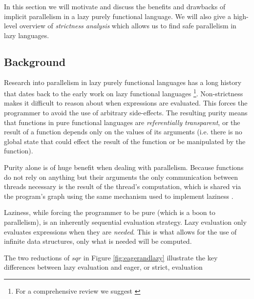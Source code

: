 In this section we will motivate and discuss the benefits and drawbacks of
implicit parallelism in a lazy purely functional language. We will also give
a high-level overview of \emph{strictness analysis} which allows us to find safe
parallelism in lazy languages.

\subsection{Background}

Research into parallelism in lazy purely functional languages has a long
history that dates back to the early work on lazy functional languages
\citep{hughes:thesis, vGMachine, dutchBook, SPJ:PIFPL}\footnote{For a
comprehensive review we suggest \citep{hammond2000research}}. Non-strictness
makes it difficult to reason about when expressions are evaluated. This forces
the programmer to avoid the use of arbitrary side-effects. The resulting purity
means that functions in pure functional languages are \emph{referentially
transparent}, or the result of a function depends only on the values of its
arguments (i.e.  there is no global state that could effect the result of the
function or be manipulated by the function).

Purity alone is of huge benefit when dealing with parallelism. Because
functions do not rely on anything but their arguments the only communication
between threads necessary is the result of the thread's computation, which is
shared via the program's graph using the same mechanism used to implement
laziness \citep{SPJ:PIFPL}.

Laziness, while forcing the programmer to be pure (which is a boon to
parallelism), is an inherently sequential evaluation strategy. Lazy evaluation
only evaluates expressions when they are \emph{needed}. This is what allows for
the use of infinite data structures, only what is needed will be computed.

The two reductions of $sqr$ in Figure \ref{fig:eagerandlazy} illustrate the key
differences between lazy evaluation and eager, or strict, evaluation


